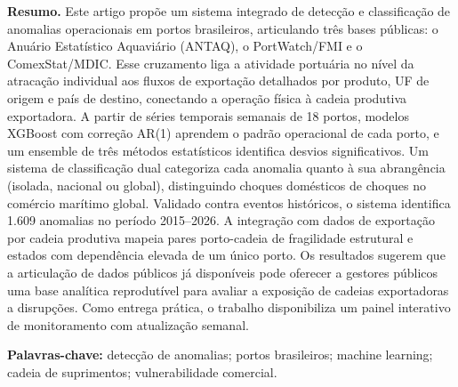 {%
\noindent\textbf{Resumo.}
Este artigo propõe um sistema integrado de detecção e classificação de anomalias operacionais em portos brasileiros, articulando três bases públicas: o Anuário Estatístico Aquaviário (ANTAQ), o PortWatch/FMI e o ComexStat/MDIC. Esse cruzamento liga a atividade portuária no nível da atracação individual aos fluxos de exportação detalhados por produto, UF de origem e país de destino, conectando a operação física à cadeia produtiva exportadora. A partir de séries temporais semanais de 18 portos, modelos XGBoost com correção AR(1) aprendem o padrão operacional de cada porto, e um ensemble de três métodos estatísticos identifica desvios significativos. Um sistema de classificação dual categoriza cada anomalia quanto à sua abrangência (isolada, nacional ou global), distinguindo choques domésticos de choques no comércio marítimo global. Validado contra eventos históricos, o sistema identifica 1.609 anomalias no período 2015--2026. A integração com dados de exportação por cadeia produtiva mapeia pares porto-cadeia de fragilidade estrutural e estados com dependência elevada de um único porto. Os resultados sugerem que a articulação de dados públicos já disponíveis pode oferecer a gestores públicos uma base analítica reprodutível para avaliar a exposição de cadeias exportadoras a disrupções. Como entrega prática, o trabalho disponibiliza um painel interativo de monitoramento com atualização semanal.
\par}

\vspace{0.5cm}

\begin{flushright}
\textbf{Palavras-chave:} detecção de anomalias; portos brasileiros; machine learning;\\
cadeia de suprimentos; vulnerabilidade comercial.
\end{flushright}

\newpage
\setlength{\parindent}{1.25cm}
\setcounter{page}{1}
